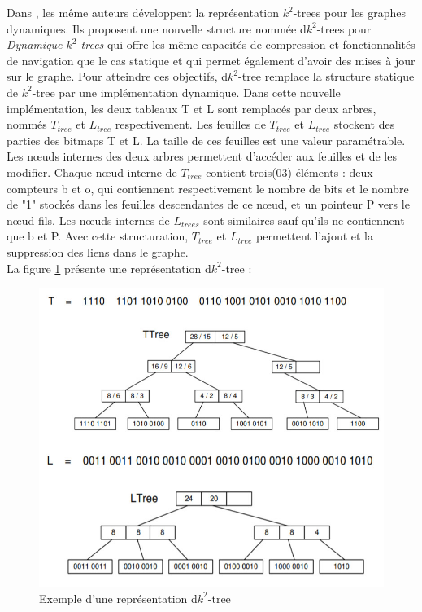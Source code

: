 Dans \citep{brisaboa2012compressed}, les même auteurs développent la représentation $k^2$-trees pour les graphes dynamiques. Ils proposent une nouvelle structure nommée d$k^2$-trees pour \textit{Dynamique $k^2$-trees} qui offre les même capacités de compression et fonctionnalités de navigation que le cas statique et qui permet également d'avoir des mises à jour sur le graphe. Pour atteindre ces objectifs, d$k^2$-tree remplace la structure statique de $k^2$-tree par une implémentation dynamique. Dans cette nouvelle implémentation, les deux tableaux T et L sont remplacés par deux arbres, nommés $T_{tree}$ et $L_{tree}$ respectivement. Les feuilles de $T_{tree}$ et $L_{tree}$ stockent des parties des bitmaps T et L. La taille de ces feuilles est une valeur paramétrable. Les nœuds internes des deux arbres permettent d'accéder aux feuilles et de les modifier.
Chaque nœud interne de $T_{tree}$ contient trois(03) éléments : deux compteurs b et o, qui contiennent respectivement le nombre de bits et le nombre de "1" stockés dans les feuilles descendantes de ce nœud, et un pointeur P vers le nœud fils. Les nœuds internes de $L_{trees}$ sont similaires sauf qu'ils ne contiennent que b et P. Avec cette structuration, $T_{tree}$ et $L_{tree}$ permettent l'ajout et la suppression des liens dans le graphe.\\
La figure \ref{dk2-trees} présente une représentation d$k^2$-tree \citep{brisaboa2012compressed}: 
\begin{figure}[H]
\begin{center}
\includegraphics[scale=0.7]{./ressources/image/dk2-trees.jpg} 
\end{center}
\caption{Exemple d'une représentation d$k^2$-tree}
\label{dk2-trees}
\end{figure}

